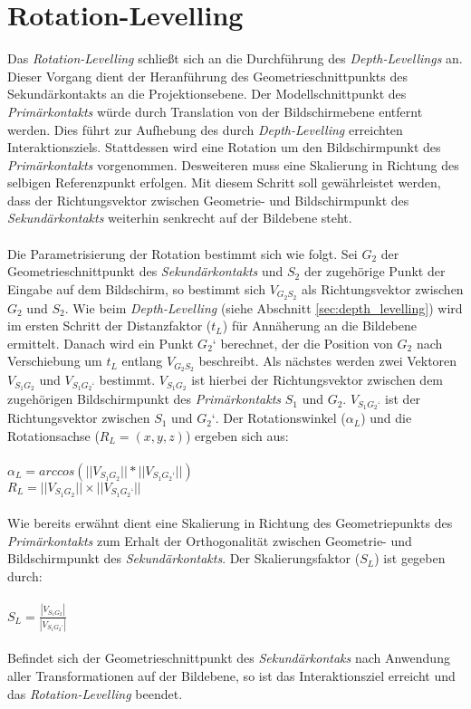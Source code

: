 \section{Rotation-Levelling}
\label{sec:rotation_levelling}

Das \emph{Rotation-Levelling} schließt sich an die Durchführung des \emph{Depth-Levellings} an. Dieser Vorgang dient der Heranführung des Geometrieschnittpunkts des Sekundärkontakts an die Projektionsebene. Der Modellschnittpunkt des \emph{Primärkontakts} würde durch Translation von der Bildschirmebene entfernt werden. Dies führt zur Aufhebung des durch \emph{Depth-Levelling} erreichten Interaktionsziels. Stattdessen wird eine Rotation um den Bildschirmpunkt des \emph{Primärkontakts} vorgenommen. Desweiteren muss eine Skalierung in Richtung des selbigen Referenzpunkt erfolgen. Mit diesem Schritt soll gewährleistet werden, dass der Richtungsvektor zwischen Geometrie- und Bildschirmpunkt des \emph{Sekundärkontakts} weiterhin senkrecht auf der Bildebene steht.
\\\\
Die Parametrisierung der Rotation bestimmt sich wie folgt.  Sei $G_2$ der Geometrieschnittpunkt des \emph{Sekundärkontakts} und $S_2$ der zugehörige Punkt der Eingabe auf dem Bildschirm, so bestimmt sich $V_{G_2S_2}$ als Richtungsvektor zwischen $G_2$ und $S_2$. Wie beim \emph{Depth-Levelling} (siehe Abschnitt \ref{sec:depth_levelling}) wird im ersten Schritt der Distanzfaktor ($t_L$) für Annäherung an die Bildebene ermittelt. Danach wird ein Punkt $G_2‘$ berechnet, der die Position von $G_2$ nach Verschiebung um $t_L$ entlang $V_{G_2S_2}$ beschreibt. Als nächstes werden zwei Vektoren $V_{S_1G_2}$ und $V_{S_1G_2‘}$ bestimmt. $V_{S_1G_2}$ ist hierbei der Richtungsvektor zwischen dem zugehörigen Bildschirmpunkt des \emph{Primärkontakts} $S_1$ und $G_2$. $V_{S_1G_2‘}$ ist der Richtungsvektor zwischen $S_1$ und $G_2‘$. Der Rotationswinkel ($\alpha_L$) und die Rotationsachse ($R_L = (x, y, z)$) ergeben sich aus:
\\\\
$\alpha_L = arccos(||V_{S_1G_2}|| * || V_{S_1G_2‘}||)$
\\
$R_L = ||V_{S_1G_2}|| \times ||V_{S_1G_2‘}||$ 
\\\\
Wie bereits erwähnt dient eine Skalierung in Richtung des Geometriepunkts des \emph{Primärkontakts} zum Erhalt der Orthogonalität zwischen Geometrie- und Bildschirmpunkt des \emph{Sekundärkontakts}. Der Skalierungsfaktor ($S_L$) ist gegeben durch:
\\\\
$S_L = \frac{|V_{S_1G_2}|}{|V_{S_1G_2‘}|}$
\\\\
Befindet sich der Geometrieschnittpunkt des \emph{Sekundärkontaks} nach Anwendung aller Transformationen auf der Bildebene, so ist das Interaktionsziel erreicht und das \emph{Rotation-Levelling} beendet.


